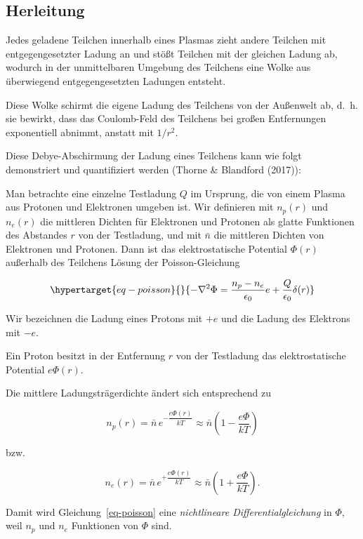 \documentclass[
  a4paper,
  DIV=11]{scrreprt}
\begin{document}
\hypertarget{herleitung}{%
\subsection{Herleitung}\label{herleitung}}

Jedes geladene Teilchen innerhalb eines Plasmas zieht andere Teilchen
mit entgegengesetzter Ladung an und stößt Teilchen mit der gleichen
Ladung ab, wodurch in der unmittelbaren Umgebung des Teilchens eine
Wolke aus überwiegend entgegengesetzten Ladungen entsteht.

Diese Wolke schirmt die eigene Ladung des Teilchens von der Außenwelt
ab, d.~h. sie bewirkt, dass das Coulomb-Feld des Teilchens bei großen
Entfernungen exponentiell abnimmt, anstatt mit \(1/r^2\).

Diese Debye-Abschirmung der Ladung eines Teilchens kann wie folgt
demonstriert und quantifiziert werden (Thorne \& Blandford (2017)):

Man betrachte eine einzelne Testladung \(Q\) im Ursprung, die von einem
Plasma aus Protonen und Elektronen umgeben ist. Wir definieren mit
\(n_p(r)\) und \(n_e(r)\) die mittleren Dichten für Elektronen und
Protonen als glatte Funktionen des Abstandes \(r\) von der Testladung,
und mit \(\bar n\) die mittleren Dichten von Elektronen und Protonen.
Dann ist das elektrostatische Potential \(\Phi(r)\) außerhalb des
Teilchens Lösung der Poisson-Gleichung

\begin{equation}\protect\hypertarget{eq-poisson}{}{
-\nabla^2 \Phi = \frac{n_p - n_e}{\epsilon_0} e + \frac{Q}{\epsilon_0} \delta(r)
}\label{eq-poisson}\end{equation}

Wir bezeichnen die Ladung eines Protons mit \(+e\) und die Ladung des
Elektrons mit \(-e\).

Ein Proton besitzt in der Entfernung \(r\) von der Testladung das
elektrostatische Potential \(e \Phi(r)\).

Die mittlere Ladungsträgerdichte ändert sich entsprechend zu

\[
n_p(r) = \bar n \, e^{-\dfrac{e \Phi(r)}{kT}} \approx \bar n \left(1 - \frac{e \Phi}{k T} \right)
\]

bzw.

\[
n_e(r) = \bar n \, e^{+\dfrac{e \Phi(r)}{kT}} \approx \bar n \left(1 + \frac{e \Phi}{k T} \right).
\]

Damit wird Gleichung~\ref{eq-poisson} eine \emph{nichtlineare
Differentialgleichung} in \(\Phi\), weil \(n_p\) und \(n_e\) Funktionen
von \(\Phi\) sind.
\end{document}
